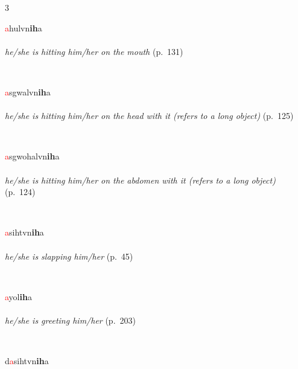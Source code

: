 \documentclass[oneside,openany]{book}%
\begin{document}
\noindent\begin{multicols}{3}%
\begin{minipage}[t]{\linewidth}
\raggedright\noindent \textcolor{Red}{a}hulvn\textbf{ih}a\\
\\
\noindent \textit{he/she is hitting him/her on the mouth} (p.~131)
\end{minipage}\\[1em]%
\begin{minipage}[t]{\linewidth}
\raggedright\noindent \textcolor{Red}{a}sgwalvn\textbf{ih}a\\
\\
\noindent \textit{he/she is hitting him/her on the head with it (refers to a long object)} (p.~125)
\end{minipage}\\[1em]%
\begin{minipage}[t]{\linewidth}
\raggedright\noindent \textcolor{Red}{a}sgwohalvn\textbf{ih}a\\
\\
\noindent \textit{he/she is hitting him/her on the abdomen with it (refers to a long object)} (p.~124)
\end{minipage}\\[1em]%
\begin{minipage}[t]{\linewidth}
\raggedright\noindent \textcolor{Red}{a}sihtvn\textbf{ih}a\\
\\
\noindent \textit{he/she is slapping him/her} (p.~45)
\end{minipage}\\[1em]%
\begin{minipage}[t]{\linewidth}
\raggedright\noindent \textcolor{Red}{a}yol\textbf{ih}a\\
\\
\noindent \textit{he/she is greeting him/her} (p.~203)
\end{minipage}\\[1em]%
\begin{minipage}[t]{\linewidth}
\raggedright\noindent d\textcolor{Red}{a}sihtvn\textbf{ih}a\\

\end{minipage}
\end{multicols}
\end{document}
